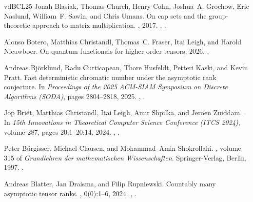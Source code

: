 \documentclass[11pt,letterpaper]{article}
\begin{document}
\begin{thebibliography}{vdBCL{\etalchar{+}}25}
Jonah Blasiak, Thomas Church, Henry Cohn, Joshua~A. Grochow, Eric Naslund,
  William~F. Sawin, and Chris Umans.
\newblock On cap sets and the group-theoretic approach to matrix
  multiplication.
, 2017.
\newblock \href {https://arxiv.org/abs/1605.06702} {},
  \href {https://doi.org/10.19086/da.1245} {}.

Alonso Botero, Matthias Christandl, Thomas~C. Fraser, Itai Leigh, and Harold
  Nieuwboer.
\newblock On quantum functionals for higher-order tensors, 2026.
\newblock \href {https://arxiv.org/abs/2604.18283} {}.

Andreas Björklund, Radu Curticapean, Thore Husfeldt, Petteri Kaski, and Kevin
  Pratt.
\newblock Fast deterministic chromatic number under the asymptotic rank
  conjecture.
\newblock In {\em Proceedings of the 2025 ACM-SIAM Symposium on Discrete
  Algorithms (SODA)}, pages 2804--2818, 2025.
\newblock \href {https://arxiv.org/abs/2404.04987} {},
  \href {https://doi.org/10.1137/1.9781611978322.91}
  {}.

Jop Bri\"{e}t, Matthias Christandl, Itai Leigh, Amir Shpilka, and Jeroen
  Zuiddam.
.
\newblock In {\em 15th Innovations in Theoretical Computer Science Conference
  (ITCS 2024)}, volume 287, pages 20:1--20:14, 2024.
\newblock \href {https://arxiv.org/abs/2306.01718} {},
  \href {https://doi.org/10.4230/LIPIcs.ITCS.2024.20}
  {}.

Peter B\"{u}rgisser, Michael Clausen, and Mohammad~Amin Shokrollahi.
, volume 315 of {\em Grundlehren der
  mathematischen Wissenschaften}.
\newblock Springer-Verlag, Berlin, 1997.
\newblock \href {https://doi.org/10.1007/978-3-662-03338-8}
  {}.

Andreas Blatter, Jan Draisma, and Filip Rupniewski.
\newblock Countably many asymptotic tensor ranks.
, 0(0):1--6, 2024.
\newblock \href {https://arxiv.org/abs/2212.12219} {},
  \href {https://doi.org/10.1080/03081087.2024.2317906}
  {}.


\end{thebibliography}
\end{document}
